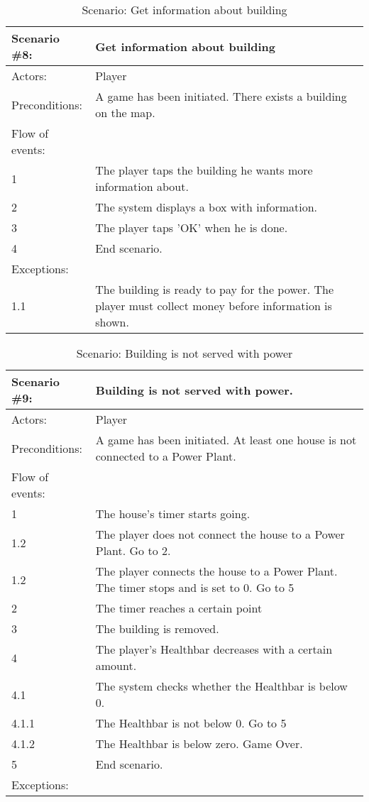 \begin{table}
	\begin{tabular}{| l | p{10cm} |}
		\hline
		\rowcolor{lightgray}
		{\bf Scenario \#8:} & {\bf Get information about building} \\ \hline
		Actors: & Player \\ \hline
		Preconditions: & A game has been initiated. There exists a building on the map. \\ \hline
		Flow of events: & \\ \hline
		1 & The player taps the building he wants more information about. \\ \hline
		2 & The system displays a box with information. \\ \hline
		3 & The player taps 'OK' when he is done. \\ \hline
		4 & End scenario. \\ \hline
		Exceptions: & \\ \hline
		1.1 & The building is ready to pay for the power. The player must collect money before information is shown. \\ \hline
	\end{tabular}
\caption{Scenario: Get information about building}
\end{table}

\begin{table}
	\begin{tabular}{| l | p{10cm} |}
		\hline
		\rowcolor{lightgray}
		{\bf Scenario \#9:} & {\bf Building is not served with power.} \\ \hline
		Actors: & Player \\ \hline
		Preconditions: & A game has been initiated. At least one house is not connected to a Power Plant. \\ \hline
		Flow of events: & \\ \hline
		1 & The house's timer starts going. \\ \hline
		1.2 & The player does not connect the house to a Power Plant. Go to 2. \\ \hline
		1.2 & The player connects the house to a Power Plant. The timer stops and is set to 0. Go to 5 \\ \hline
		2 & The timer reaches a certain point \\ \hline
		3 & The building is removed. \\ \hline
		4 & The player's Healthbar decreases with a certain amount. \\ \hline
		4.1 & The system checks whether the Healthbar is below 0. \\ \hline
		4.1.1 & The Healthbar is not below 0. Go to 5 \\ \hline
		4.1.2 & The Healthbar is below zero. Game Over. \\ \hline
		5 & End scenario. \\ \hline
		Exceptions: & \\ \hline	
	\end{tabular}
	\caption{Scenario: Building is not served with power}
\end{table}

